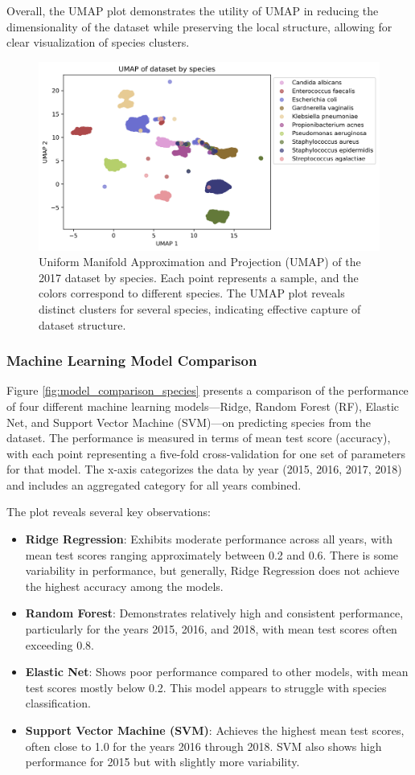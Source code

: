 \documentclass[english,11pt,a4paper,titlepage]{article}
\begin{document}
Overall, the UMAP plot demonstrates the utility of UMAP in reducing the dimensionality of the dataset while preserving the local structure, allowing for clear visualization of species clusters.
\begin{figure}[h]
	\centering
	\includegraphics[width=0.9\linewidth]{img/UMAP_species_noRemaining.png}
	\caption{Uniform Manifold Approximation and Projection (UMAP) of the 2017 dataset by species. Each point represents a sample, and the colors correspond to different species. The UMAP plot reveals distinct clusters for several species, indicating effective capture of dataset structure.}
	\label{fig:species_umap}
\end{figure}


\subsubsection*{Machine Learning Model Comparison}
Figure \ref{fig:model_comparison_species} presents a comparison of the performance of four different machine learning models—Ridge, Random Forest (RF), Elastic Net, and Support Vector Machine (SVM)—on predicting species from the dataset. The performance is measured in terms of mean test score (accuracy), with each point representing a five-fold cross-validation for one set of parameters for that model. The x-axis categorizes the data by year (2015, 2016, 2017, 2018) and includes an aggregated category for all years combined.

The plot reveals several key observations:
\begin{itemize}
	\item \textbf{Ridge Regression}: Exhibits moderate performance across all years, with mean test scores ranging approximately between 0.2 and 0.6. There is some variability in performance, but generally, Ridge Regression does not achieve the highest accuracy among the models.
	\item \textbf{Random Forest}: Demonstrates relatively high and consistent performance, particularly for the years 2015, 2016, and 2018, with mean test scores often exceeding 0.8.
	\item \textbf{Elastic Net}: Shows poor performance compared to other models, with mean test scores mostly below 0.2. This model appears to struggle with species classification.
	\item \textbf{Support Vector Machine (SVM)}: Achieves the highest mean test scores, often close to 1.0 for the years 2016 through 2018. SVM also shows high performance for 2015 but with slightly more variability.
\end{itemize}
\end{document}
